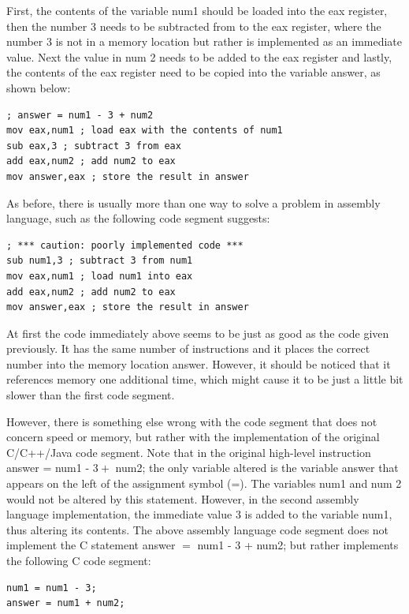 \documentclass[10pt]{article}
\begin{document}
First, the contents of the variable num1 should be loaded into the eax register, then the number 3 needs to be subtracted from to the eax register, where the number 3 is not in a memory location but rather is implemented as an immediate\\
value. Next the value in num 2 needs to be added to the eax register and lastly, the contents of the eax register need to be copied into the variable answer, as shown below:

\begin{verbatim}
; answer = num1 - 3 + num2
mov eax,num1 ; load eax with the contents of num1
sub eax,3 ; subtract 3 from eax
add eax,num2 ; add num2 to eax
mov answer,eax ; store the result in answer
\end{verbatim}

As before, there is usually more than one way to solve a problem in assembly language, such as the following code segment suggests:

\begin{verbatim}
; *** caution: poorly implemented code ***
sub num1,3 ; subtract 3 from num1
mov eax,num1 ; load num1 into eax
add eax,num2 ; add num2 to eax
mov answer,eax ; store the result in answer
\end{verbatim}

At first the code immediately above seems to be just as good as the code given previously. It has the same number of instructions and it places the correct number into the memory location answer. However, it should be noticed that it references memory one additional time, which might cause it to be just a little bit slower than the first code segment.

However, there is something else wrong with the code segment that does not concern speed or memory, but rather with the implementation of the original C/C++/Java code segment. Note that in the original high-level instruction answer = num1 - $3+$ num2; the only variable altered is the variable answer that appears on the left of the assignment symbol (=). The variables num1 and num 2 would not be altered by this statement. However, in the second assembly language implementation, the immediate value 3 is added to the variable num1, thus altering its contents. The above assembly language code segment does not implement the C statement answer $=$ num1 - 3 + num2; but rather implements the following C code segment:

\begin{verbatim}
num1 = num1 - 3;
answer = num1 + num2;
\end{verbatim}
\end{document}

